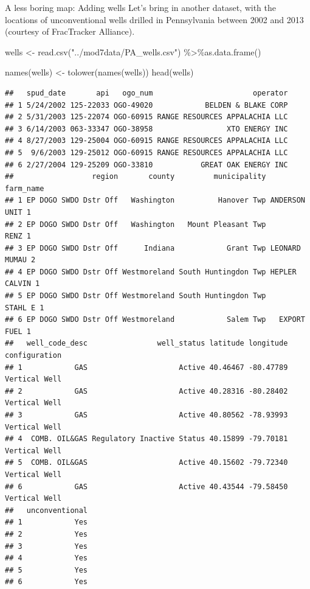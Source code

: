 \documentclass[
  ignorenonframetext,
]{beamer}
\newenvironment{Shaded}{\begin{snugshade}}{\end{snugshade}}
\newcommand{\FunctionTok}[1]{\textcolor[rgb]{0.00,0.00,0.00}{#1}}
\newcommand{\NormalTok}[1]{#1}
\newcommand{\OtherTok}[1]{\textcolor[rgb]{0.56,0.35,0.01}{#1}}
\newcommand{\SpecialCharTok}[1]{\textcolor[rgb]{0.00,0.00,0.00}{#1}}
\newcommand{\StringTok}[1]{\textcolor[rgb]{0.31,0.60,0.02}{#1}}
\begin{document}
\begin{frame}[fragile]{A less boring map: Adding wells}
\protect\hypertarget{a-less-boring-map-adding-wells}{}
Let's bring in another dataset, with the locations of unconventional
wells drilled in Pennsylvania between 2002 and 2013 (courtesy of
FracTracker Alliance).

\tiny

\begin{Shaded}
\begin{Highlighting}[]
\NormalTok{wells }\OtherTok{\textless{}{-}} \FunctionTok{read.csv}\NormalTok{(}\StringTok{"../mod7data/PA\_wells.csv"}\NormalTok{) }\SpecialCharTok{\%\textgreater{}\%}\FunctionTok{as.data.frame}\NormalTok{()}

\FunctionTok{names}\NormalTok{(wells) }\OtherTok{\textless{}{-}} \FunctionTok{tolower}\NormalTok{(}\FunctionTok{names}\NormalTok{(wells))}
\FunctionTok{head}\NormalTok{(wells)}
\end{Highlighting}
\end{Shaded}

\begin{verbatim}
##   spud_date       api   ogo_num                       operator
## 1 5/24/2002 125-22033 OGO-49020            BELDEN & BLAKE CORP
## 2 5/31/2003 125-22074 OGO-60915 RANGE RESOURCES APPALACHIA LLC
## 3 6/14/2003 063-33347 OGO-38958                 XTO ENERGY INC
## 4 8/27/2003 129-25004 OGO-60915 RANGE RESOURCES APPALACHIA LLC
## 5  9/6/2003 129-25012 OGO-60915 RANGE RESOURCES APPALACHIA LLC
## 6 2/27/2004 129-25209 OGO-33810           GREAT OAK ENERGY INC
##                  region       county         municipality       farm_name
## 1 EP DOGO SWDO Dstr Off   Washington          Hanover Twp ANDERSON UNIT 1
## 2 EP DOGO SWDO Dstr Off   Washington   Mount Pleasant Twp          RENZ 1
## 3 EP DOGO SWDO Dstr Off      Indiana            Grant Twp LEONARD MUMAU 2
## 4 EP DOGO SWDO Dstr Off Westmoreland South Huntingdon Twp HEPLER CALVIN 1
## 5 EP DOGO SWDO Dstr Off Westmoreland South Huntingdon Twp       STAHL E 1
## 6 EP DOGO SWDO Dstr Off Westmoreland            Salem Twp   EXPORT FUEL 1
##   well_code_desc                well_status latitude longitude configuration
## 1            GAS                     Active 40.46467 -80.47789 Vertical Well
## 2            GAS                     Active 40.28316 -80.28402 Vertical Well
## 3            GAS                     Active 40.80562 -78.93993 Vertical Well
## 4  COMB. OIL&GAS Regulatory Inactive Status 40.15899 -79.70181 Vertical Well
## 5  COMB. OIL&GAS                     Active 40.15602 -79.72340 Vertical Well
## 6            GAS                     Active 40.43544 -79.58450 Vertical Well
##   unconventional
## 1            Yes
## 2            Yes
## 3            Yes
## 4            Yes
## 5            Yes
## 6            Yes
\end{verbatim}
\end{frame}
\end{document}
